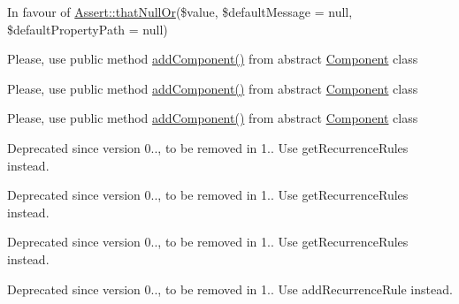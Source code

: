 \begin{DoxyRefList}
\item[\label{deprecated__deprecated000003}%
\Hypertarget{deprecated__deprecated000003}%
Element \mbox{\hyperlink{namespace_assert_af03f4db4476f5f158ed16b6e0bfce05f}{Assert\+:\+:that\+Null\+Or}} (\$value, \$default\+Message=null, \$default\+Property\+Path=null)]In favour of \mbox{\hyperlink{namespace_assert_af03f4db4476f5f158ed16b6e0bfce05f}{Assert\+::that\+Null\+Or}}(\$value, \$default\+Message = null, \$default\+Property\+Path = null)  
\item[\label{deprecated__deprecated000009}%
\Hypertarget{deprecated__deprecated000009}%
Klasse \mbox{\hyperlink{class_cron_next_cloud}{Cron\+Next\+Cloud}} ]
\item[\label{deprecated__deprecated000043}%
\Hypertarget{deprecated__deprecated000043}%
Element \mbox{\hyperlink{class_d_b_af81dc9b99fb7289bfd817cc0b91b5e0d}{DB\+:\+:is\+Testversion}} ()]
\item[\label{deprecated__deprecated000004}%
\Hypertarget{deprecated__deprecated000004}%
Element \mbox{\hyperlink{class_eluceo_1_1i_cal_1_1_component_1_1_calendar_a1f0cf8d3ca1bfee4d03b352d2f6d1698}{Eluceo\+:\+:add\+Event}} (\mbox{\hyperlink{class_eluceo_1_1i_cal_1_1_component_1_1_event}{Event}} \$event)]Please, use public method \mbox{\hyperlink{class_eluceo_1_1i_cal_1_1_component_a5adac138a8cda08ed3c60b298cc9e145}{add\+Component()}} from abstract \mbox{\hyperlink{class_eluceo_1_1i_cal_1_1_component}{Component}} class

Please, use public method \mbox{\hyperlink{class_eluceo_1_1i_cal_1_1_component_a5adac138a8cda08ed3c60b298cc9e145}{add\+Component()}} from abstract \mbox{\hyperlink{class_eluceo_1_1i_cal_1_1_component}{Component}} class

Please, use public method \mbox{\hyperlink{class_eluceo_1_1i_cal_1_1_component_a5adac138a8cda08ed3c60b298cc9e145}{add\+Component()}} from abstract \mbox{\hyperlink{class_eluceo_1_1i_cal_1_1_component}{Component}} class 
\item[\label{deprecated__deprecated000006}%
\Hypertarget{deprecated__deprecated000006}%
Element \mbox{\hyperlink{class_eluceo_1_1i_cal_1_1_component_1_1_event_a4414331a51599c2dd5432eba86008518}{Eluceo\+:\+:get\+Recurrence\+Rule}} ()]Deprecated since version 0.., to be removed in 1.. Use get\+Recurrence\+Rules instead.

Deprecated since version 0.., to be removed in 1.. Use get\+Recurrence\+Rules instead.

Deprecated since version 0.., to be removed in 1.. Use get\+Recurrence\+Rules instead. 
\item[\label{deprecated__deprecated000005}%
\Hypertarget{deprecated__deprecated000005}%
Element \mbox{\hyperlink{class_eluceo_1_1i_cal_1_1_component_1_1_event_a8301adc5310ee5a3281f40599607c86d}{Eluceo\+:\+:set\+Recurrence\+Rule}} (Recurrence\+Rule \$recurrence\+Rule)]Deprecated since version 0.., to be removed in 1.. Use add\+Recurrence\+Rule instead.


\end{DoxyRefList}
